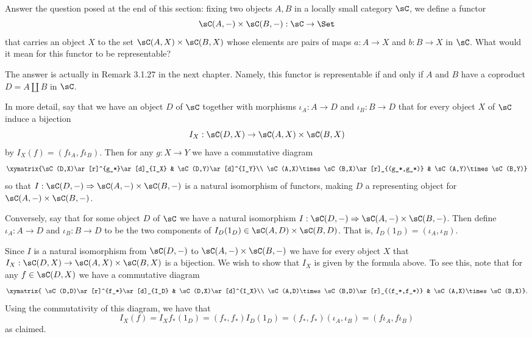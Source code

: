 \documentclass[main.tex]{subfiles}
\begin{document}
\paragraph{}
\begin{exercise}
Answer the question posed at the end of this section: fixing two objects $A,B$ in a locally small category $\sC$, we define a functor
\[\sC(A,-)\times\sC(B,-):\sC\rightarrow\Set\]
that carries an object $X$ to the set $\sC(A,X)\times\sC(B,X)$ whose elements are pairs of maps $a:A\rightarrow X$ and $b:B\rightarrow X$ in $\sC$. What would it mean for this functor to be representable?
\end{exercise}

The answer is actually in Remark 3.1.27 in the next chapter. Namely,  this functor is representable if and only if $A$ and $B$ have a coproduct $D=A\coprod B$ in $\sC$.

In more detail, say that we have an object $D$ of $\sC$ together with morphisms $\iota_A:A\rightarrow D$ and $\iota_B:B\rightarrow D$ that for every object $X$ of $\sC$ induce a bijection
\[I_X:\sC(D,X)\rightarrow\sC(A,X)\times\sC(B,X)\]
by $I_X(f)=(f\iota_A,f\iota_B)$. Then for any $g:X\rightarrow Y$ we have a commutative diagram
\[\xymatrix{\sC(D,X)\ar[r]^{g_*}\ar[d]_{I_X} & \sC(D,Y)\ar[d]^{I_Y}\\
\sC(A,X)\times\sC(B,X)\ar[r]_{(g_*,g_*)} & \sC(A,Y)\times\sC(B,Y)}\]
so that $I:\sC(D,-)\Rightarrow\sC(A,-)\times\sC(B,-)$ is a natural isomorphism of functors, making $D$ a representing object for $\sC(A,-)\times\sC(B,-)$.

Conversely, say that for some object $D$ of $\sC$ we have a natural isomorphism $I:\sC(D,-)\Rightarrow\sC(A,-)\times\sC(B,-)$. Then define $\iota_A:A\rightarrow D$ and $\iota_B:B\rightarrow D$ to be the two components of $I_D(1_D)\in\sC(A,D)\times\sC(B,D)$. That is, $I_D(1_D)=(\iota_A,\iota_B)$.

Since $I$ is a natural isomorphism from $\sC(D,-)$ to $\sC(A,-)\times\sC(B,-)$ we have for every object $X$ that $I_X:\sC(D,X)\rightarrow\sC(A,X)\times\sC(B,X)$ is a bijection. We wish to show that $I_X$ is given by the formula above. To see this, note that for any $f\in\sC(D,X)$ we have a commutative diagram
\[\xymatrix{
\sC(D,D)\ar[r]^{f_*}\ar[d]_{I_D} & \sC(D,X)\ar[d]^{I_X}\\
\sC(A,D)\times\sC(B,D)\ar[r]_{(f_*,f_*)} & \sC(A,X)\times\sC(B,X)}.\]
Using the commutativity of this diagram, we have that
\[I_X(f)=I_Xf_*(1_D)=(f_*,f_*)I_D(1_D)=(f_*,f_*)(\iota_A,\iota_B)=(f\iota_A,f\iota_B)\]
as claimed.
\end{document}
